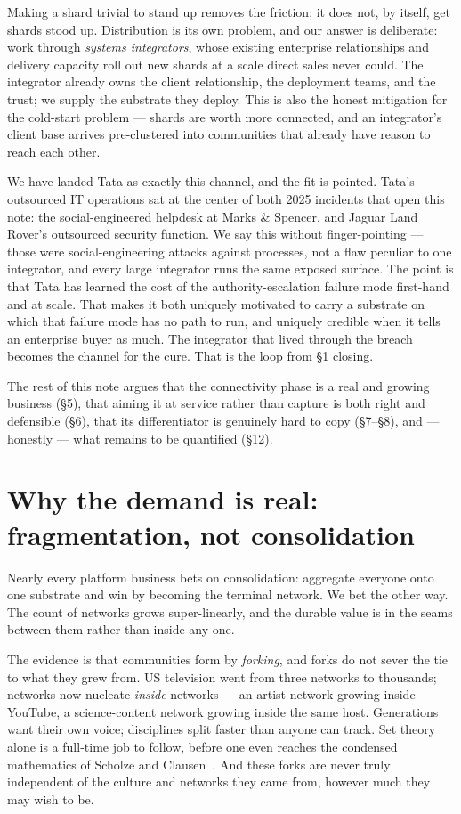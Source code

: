 \documentclass[11pt]{article}
\begin{document}
Making a shard trivial to stand up removes the friction; it does not, by itself, get shards stood up. Distribution is its own problem, and our answer is deliberate: work through \emph{systems integrators}, whose existing enterprise relationships and delivery capacity roll out new shards at a scale direct sales never could. The integrator already owns the client relationship, the deployment teams, and the trust; we supply the substrate they deploy. This is also the honest mitigation for the cold-start problem --- shards are worth more connected, and an integrator's client base arrives pre-clustered into communities that already have reason to reach each other.

We have landed Tata as exactly this channel, and the fit is pointed. Tata's outsourced IT operations sat at the center of both 2025 incidents that open this note: the social-engineered helpdesk at Marks \& Spencer, and Jaguar Land Rover's outsourced security function. We say this without finger-pointing --- those were social-engineering attacks against processes, not a flaw peculiar to one integrator, and every large integrator runs the same exposed surface. The point is that Tata has learned the cost of the authority-escalation failure mode first-hand and at scale. That makes it both uniquely motivated to carry a substrate on which that failure mode has no path to run, and uniquely credible when it tells an enterprise buyer as much. The integrator that lived through the breach becomes the channel for the cure. That is the loop from \S1 closing.

The rest of this note argues that the connectivity phase is a real and growing business (\S5), that aiming it at service rather than capture is both right and defensible (\S6), that its differentiator is genuinely hard to copy (\S7--\S8), and --- honestly --- what remains to be quantified (\S12).

\section{Why the demand is real: fragmentation, not consolidation}

Nearly every platform business bets on consolidation: aggregate everyone onto one substrate and win by becoming the terminal network. We bet the other way. The count of networks grows super-linearly, and the durable value is in the seams between them rather than inside any one.

The evidence is that communities form by \emph{forking}, and forks do not sever the tie to what they grew from. US television went from three networks to thousands; networks now nucleate \emph{inside} networks --- an artist network growing inside YouTube, a science-content network growing inside the same host. Generations want their own voice; disciplines split faster than anyone can track. Set theory alone is a full-time job to follow, before one even reaches the condensed mathematics of Scholze and Clausen~\cite{condensed}. And these forks are never truly independent of the culture and networks they came from, however much they may wish to be.
\end{document}
